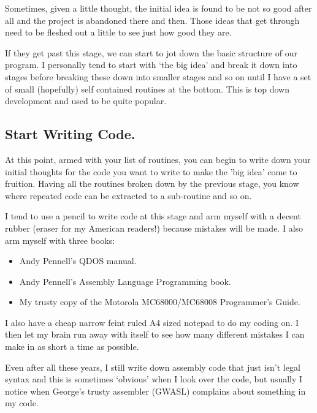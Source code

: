 Sometimes, given a little thought, the initial idea is found to be
      not so good after all and the project is abandoned there and then. Those
      ideas that get through need to be fleshed out a little to see just how
      good they are.

If they get past this stage, we can start to jot down the basic
      structure of our program. I personally tend to start with `the big idea'
      and break it down into stages before breaking these down into smaller
      stages and so on until I have a set of small (hopefully) self contained
      routines at the bottom. This is top down development and used to be
      quite popular.

\subsection{Start Writing Code.}
\label{ch14-start-coding}%

At this point, armed with your list of routines, you can begin to
      write down your initial thoughts for the code you want to write to make
      the 'big idea' come to fruition. Having all the routines broken down by
      the previous stage, you know where repeated code can be extracted to a
      sub-{}routine and so on.

I tend to use a pencil to write code at this stage and arm myself
      with a decent rubber (eraser for my American readers!) because mistakes
      will be made. I also arm myself with three books:
\begin{itemize}[itemsep=0pt]

\item{}Andy Pennell's QDOS manual.


\item{}Andy Pennell's Assembly Language Programming book.


\item{}My trusty copy of the Motorola MC68000/MC68008 Programmer's
          Guide.

\end{itemize}

I also have a cheap narrow feint ruled A4 sized notepad to do my
      coding on. I then let my brain run away with itself to see how many
      different mistakes I can make in as short a time as possible.

Even after all these years, I still write down assembly code that
      just isn't legal syntax and this is sometimes `obvious' when I look over
      the code, but usually I notice when George's trusty assembler (GWASL)
      complains about something in my code.

